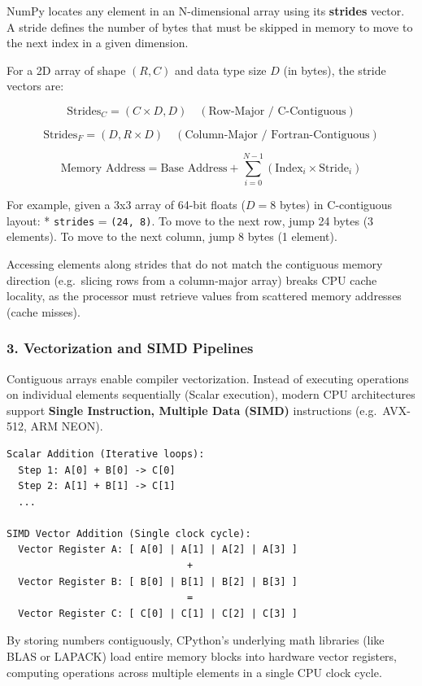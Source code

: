 NumPy locates any element in an N-dimensional array using its
\textbf{strides} vector. A stride defines the number of bytes that must
be skipped in memory to move to the next index in a given dimension.

For a 2D array of shape \((R, C)\) and data type size \(D\) (in bytes),
the stride vectors are:

\[\text{Strides}_C = (C \times D, D) \quad (\text{Row-Major / C-Contiguous})\]

\[\text{Strides}_F = (D, R \times D) \quad (\text{Column-Major / Fortran-Contiguous})\]

\[\text{Memory Address} = \text{Base Address} + \sum_{i=0}^{N-1} (\text{Index}_i \times \text{Stride}_i)\]

For example, given a 3x3 array of 64-bit floats (\(D = 8\) bytes) in
C-contiguous layout: * \passthrough{\lstinline!strides!} =
\passthrough{\lstinline!(24, 8)!}. To move to the next row, jump 24
bytes (3 elements). To move to the next column, jump 8 bytes (1
element).

Accessing elements along strides that do not match the contiguous memory
direction (e.g.~slicing rows from a column-major array) breaks CPU cache
locality, as the processor must retrieve values from scattered memory
addresses (cache misses).

\hypertarget{vectorization-and-simd-pipelines}{%
\subsubsection{3. Vectorization and SIMD
Pipelines}\label{vectorization-and-simd-pipelines}}

Contiguous arrays enable compiler vectorization. Instead of executing
operations on individual elements sequentially (Scalar execution),
modern CPU architectures support \textbf{Single Instruction, Multiple
Data (SIMD)} instructions (e.g.~AVX-512, ARM NEON).

\begin{lstlisting}
Scalar Addition (Iterative loops):
  Step 1: A[0] + B[0] -> C[0]
  Step 2: A[1] + B[1] -> C[1]
  ...

SIMD Vector Addition (Single clock cycle):
  Vector Register A: [ A[0] | A[1] | A[2] | A[3] ]
                               +
  Vector Register B: [ B[0] | B[1] | B[2] | B[3] ]
                               =
  Vector Register C: [ C[0] | C[1] | C[2] | C[3] ]
\end{lstlisting}

By storing numbers contiguously, CPython's underlying math libraries
(like BLAS or LAPACK) load entire memory blocks into hardware vector
registers, computing operations across multiple elements in a single CPU
clock cycle.

